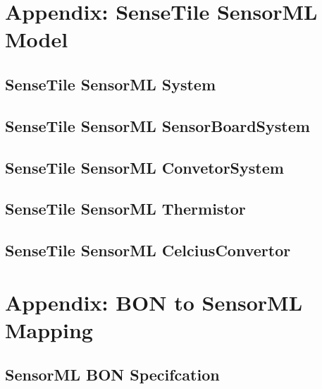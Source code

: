 \documentclass[]{final_report}
\begin{document}
\appendix
\chapter{Appendix: SenseTile SensorML Model}\label{appenA}
\section{SenseTile SensorML System}
\section{SenseTile SensorML SensorBoardSystem}
\section{SenseTile SensorML ConvetorSystem}
\section{SenseTile SensorML Thermistor}

\section{SenseTile SensorML CelciusConvertor}


\chapter{Appendix: BON to SensorML Mapping}\label{appenB}
\section {SensorML BON Specifcation}\label{appenBSMLBONSpec}

\lstset{basicstyle=\scriptsize,showspaces=false,showstringspaces=false}

\end{document}
